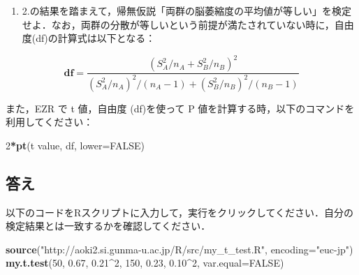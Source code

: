 \documentclass[11pt,]{problemset}
\newenvironment{Shaded}{\begin{snugshade}}{\end{snugshade}}
\newcommand{\KeywordTok}[1]{\textcolor[rgb]{0.13,0.29,0.53}{\textbf{#1}}}
\newcommand{\DataTypeTok}[1]{\textcolor[rgb]{0.13,0.29,0.53}{#1}}
\newcommand{\DecValTok}[1]{\textcolor[rgb]{0.00,0.00,0.81}{#1}}
\newcommand{\FloatTok}[1]{\textcolor[rgb]{0.00,0.00,0.81}{#1}}
\newcommand{\StringTok}[1]{\textcolor[rgb]{0.31,0.60,0.02}{#1}}
\newcommand{\OtherTok}[1]{\textcolor[rgb]{0.56,0.35,0.01}{#1}}
\newcommand{\OperatorTok}[1]{\textcolor[rgb]{0.81,0.36,0.00}{\textbf{#1}}}
\newcommand{\NormalTok}[1]{#1}
\providecommand{\tightlist}{%
  \setlength{\itemsep}{0pt}\setlength{\parskip}{0pt}}
\begin{document}
\newpage

\vfill

\begin{enumerate}
\def\labelenumi{\arabic{enumi}.}
\setcounter{enumi}{2}
\tightlist
\item
  2.の結果を踏まえて，帰無仮説「両群の脳萎縮度の平均値が等しい」を検定せよ．なお，両群の分散が等しいという前提が満たされていない時に，自由度(df)の計算式は以下となる：
\end{enumerate}

\begin{equation}
\label{eq:2}
\mathbf{df} = \frac{(S^2_A/n_A + S^2_B/n_B)^2}{(S_A^2/n_A)^2/(n_A-1)+(S_B^2/n_B)^2/(n_B-1)}
\end{equation}

また，EZR で t 値，自由度 (df)を使って P
値を計算する時，以下のコマンドを利用してください：

\begin{Shaded}
\begin{Highlighting}[]
\DecValTok{2}\OperatorTok{*}\KeywordTok{pt}\NormalTok{(t value, df, }\DataTypeTok{lower=}\OtherTok{FALSE}\NormalTok{)}
\end{Highlighting}
\end{Shaded}

\subsection{答え}\label{-2}

\newpage

\vfill
以下のコードをRスクリプトに入力して，実行をクリックしてください．自分の検定結果とは一致するかを確認してください．

\begin{Shaded}
\begin{Highlighting}[]
\KeywordTok{source}\NormalTok{(}\StringTok{"http://aoki2.si.gunma-u.ac.jp/R/src/my_t_test.R"}\NormalTok{, }\DataTypeTok{encoding=}\StringTok{"euc-jp"}\NormalTok{)}
\KeywordTok{my.t.test}\NormalTok{(}\DecValTok{50}\NormalTok{, }\FloatTok{0.67}\NormalTok{, }\FloatTok{0.21}\OperatorTok{^}\DecValTok{2}\NormalTok{, }\DecValTok{150}\NormalTok{, }\FloatTok{0.23}\NormalTok{, }\FloatTok{0.10}\OperatorTok{^}\DecValTok{2}\NormalTok{, }\DataTypeTok{var.equal=}\OtherTok{FALSE}\NormalTok{)}
\end{Highlighting}
\end{Shaded}

\bigskip\bigskip\bigskip\bigskip\bigskip
\end{document}
